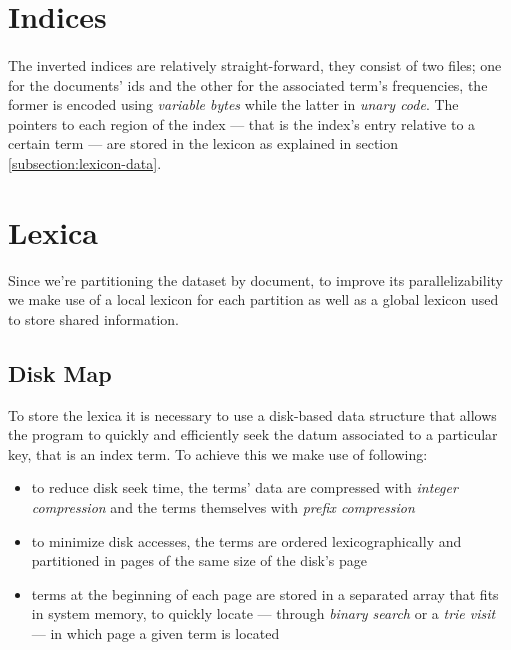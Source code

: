 \section{Indices}

\paragraph{}
The inverted indices are relatively straight-forward, they consist of two files; one for the documents' ids and the other for the associated term's frequencies, the former is encoded using \textit{variable bytes} while the latter in \textit{unary code}. The pointers to each region of the index --- that is the index's entry relative to a certain term --- are stored in the lexicon as explained in section \ref{subsection:lexicon-data}.

\section{Lexica}

Since we're partitioning the dataset by document, to improve its parallelizability we make use of a local lexicon for each partition as well as a global lexicon used to store shared information.

\subsection{Disk Map}

To store the lexica it is necessary to use a disk-based data structure that
allows the program to quickly and efficiently seek the datum associated to a
particular key, that is an index term. To achieve this we make use of following:

\begin{itemize}
	\item to reduce disk seek time, the terms' data are compressed with
	\textit{integer compression} and the terms themselves with \textit{prefix compression}
	
	\item to minimize disk accesses, the terms are ordered lexicographically
	and partitioned in pages of the same size of the disk's page
	
	\item terms at the beginning of each page are stored in a separated array that fits in system memory, to quickly locate --- through \textit{binary search} or a \textit{trie visit} --- in which page a given term is located
\end{itemize}


